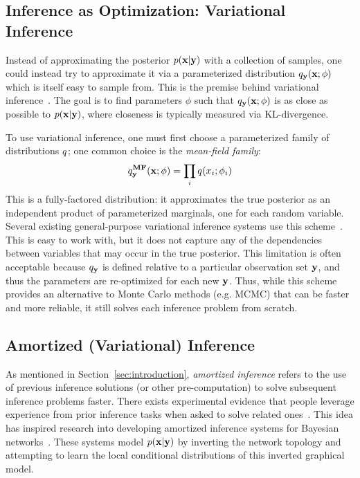 \subsection{Inference as Optimization: Variational Inference}
\label{sec:background:variational}

Instead of approximating the posterior $p(\mathbf{x} | \mathbf{y})$ with a collection of samples, one could instead try to approximate it via a parameterized distribution $q_{\mathbf{y}}(\mathbf{x} ; \phi)$ which is itself easy to sample from.
This is the premise behind variational inference~\cite{VariationalInference}.
The goal is to find parameters $\phi$ such that $q_{\mathbf{y}}(\mathbf{x} ; \phi)$ is as close as possible to $p(\mathbf{x} | \mathbf{y})$, where closeness is typically measured via KL-divergence.

To use variational inference, one must first choose a parameterized family of distributions $q$; one common choice is the \emph{mean-field family}:
\begin{equation*}
q^{\textbf{MF}}_{\mathbf{y}}(\mathbf{x} ; \phi) = \prod_i q(x_i ; \phi_i)
\end{equation*}
This is a fully-factored distribution: it approximates the true posterior as an independent product of parameterized marginals, one for each random variable.
Several existing general-purpose variational inference systems use this scheme~\cite{AVIPP,BBVI}.
This is easy to work with, but it does not capture any of the dependencies between variables that may occur in the true posterior.
This limitation is often acceptable because $q_{\mathbf{y}}$ is defined relative to a particular observation set $\mathbf{y}$, and thus the parameters are re-optimized for each new $\mathbf{y}$.
Thus, while this scheme provides an alternative to Monte Carlo methods (e.g. MCMC) that can be faster and more reliable, it still solves each inference problem from scratch.

\subsection{Amortized (Variational) Inference}

As mentioned in Section~\ref{sec:introduction}, \emph{amortized inference} refers to the use of previous inference solutions (or other pre-computation) to solve subsequent inference problems faster.
There exists experimental evidence that people leverage experience from prior inference tasks when asked to solve related ones~\cite{AmortizedInference}.
This idea has inspired research into developing amortized inference systems for Bayesian networks~\cite{StochasticInverses,NeuralStochasticInverses}. These systems model $p(\mathbf{x} | \mathbf{y})$ by inverting the network topology and attempting to learn the local conditional distributions of this inverted graphical model.

